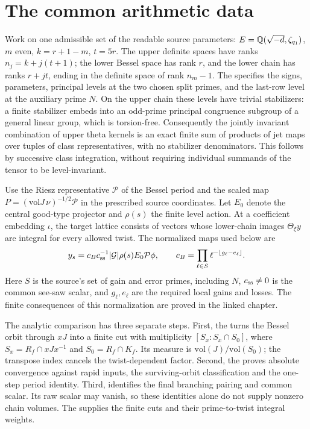 \section{The common arithmetic data}
Work on one admissible set of the readable source parameters:
\(E=\mathbb Q(\sqrt{-d},\zeta_{q_1})\), \(m\) even,
\(k=r+1-m\), \(t=5r\). The upper definite spaces have ranks
\(n_j=k+j(t+1)\); the lower Bessel space has rank \(r\), and
the lower chain has ranks \(r+jt\), ending in the definite
space of rank \(n_m-1\). The
specifies the signs, parameters, principal levels at the two
chosen split primes, and the last-row level at the auxiliary prime
\(N\). On the upper chain these levels have trivial stabilizers:
a finite stabilizer embeds into an odd-prime principal congruence
subgroup of a general linear group, which is torsion-free.
Consequently the jointly invariant combination of upper theta
kernels is an exact finite sum of products of jet maps over
tuples of class representatives, with no stabilizer denominators.
This follows by successive class integration, without requiring
individual summands of the tensor to be level-invariant.

Use the Riesz representative \(\mathcal P\) of the Bessel period
and the scaled map \(P=(\mathrm{vol}J\,\nu)^{-1/2}\mathcal P\)
in the prescribed source coordinates. Let \(E_0\) denote the
central good-type projector and \(\rho(s)\) the finite level action.
At a coefficient embedding \(\iota\), the target lattice consists
of vectors whose lower-chain images \(\Theta_\xi y\) are integral
for every allowed twist. The normalized maps used below are
\[
 y_s=c_Bc_{\rm ss}^{-1}|\mathcal G|\rho(s)E_0\mathcal P\phi,
 \qquad
 c_B=\prod_{\ell\in S}\ell^{-\lfloor g_\ell-e_\ell\rfloor}.
\]
Here \(S\) is the source's set of gain and error primes,
including \(N\), \(c_{\rm ss}\ne0\) is the common see-saw
scalar, and \(g_\ell,e_\ell\) are the required local gains
and losses. The finite consequences of this normalization
are proved in the linked chapter.

The analytic comparison has three separate steps. First, the
turns the Bessel orbit through \(xJ\) into a finite cut with multiplicity
\([S_x:S_x\cap S_0]\), where \(S_x=R_f\cap xJx^{-1}\) and
\(S_0=R_f\cap K_f\). Its measure is
\(\mathrm{vol}(J)/\mathrm{vol}(S_0)\); the transpose index cancels the
twist-dependent factor. Second, the
proves absolute convergence against rapid inputs, the surviving-orbit
classification and the one-step period identity. Third,
identifies the final branching pairing and common scalar. Its raw scalar
may vanish, so these identities alone do not supply nonzero chain volumes.
The  supplies
the finite cuts and their prime-to-twist integral weights.

